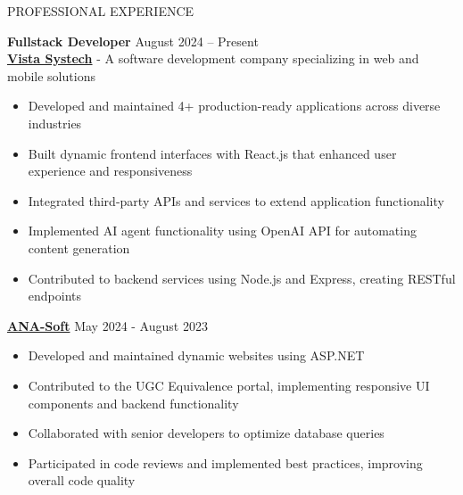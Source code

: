 \documentclass{resume} %
\begin{document}
\begin{rSection}{PROFESSIONAL EXPERIENCE}

\textbf{Fullstack Developer} \hfill August 2024 – Present\\
\textbf{\href{https://vistasystech.com/}{Vista Systech}} - A software development company specializing in web and mobile solutions

\begin{itemize}
    \itemsep -3pt {}
    \item Developed and maintained 4+ production-ready applications across diverse industries
    \item Built dynamic frontend interfaces with React.js that enhanced user experience and responsiveness
    \item Integrated third-party APIs and services to extend application functionality
    \item Implemented AI agent functionality using OpenAI API for automating content generation
    \item Contributed to backend services using Node.js and Express, creating RESTful endpoints
\end{itemize}

\textbf{\href{https://ana-soft.com/}{ANA-Soft}} \hfill May 2024 - August 2023\\
\begin{itemize}
    \itemsep -3pt {}
    \item Developed and maintained dynamic websites using ASP.NET
    \item Contributed to the UGC Equivalence portal, implementing responsive UI components and backend functionality
    \item Collaborated with senior developers to optimize database queries
    \item Participated in code reviews and implemented best practices, improving overall code quality
\end{itemize}

\end{rSection} 

\end{document}
